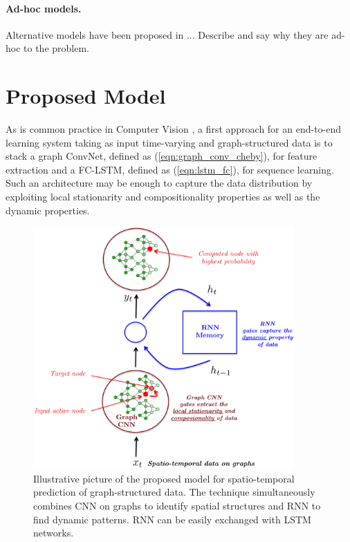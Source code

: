 \documentclass{article} %
\newcommand{\eqnref}[1]{(\ref{eqn:#1})}
\newcommand{\todo}[1]{{\color{red} #1 }}
\begin{document}
\paragraph{Ad-hoc models.} Alternative models have been proposed \todo{in ...
Describe and say why they are ad-hoc to the problem.}

\section{Proposed Model}


As is common practice in Computer Vision \citep{cnnlstm1, cnnlstm2, cnnlstm3},
a first approach for an end-to-end learning system taking as input time-varying
and graph-structured data is to stack a graph ConvNet, defined as
\eqnref{graph_conv_cheby}, for feature extraction and a FC-LSTM, defined as
\eqnref{lstm_fc}, for sequence learning. Such an architecture may be enough to
capture the data distribution by exploiting local stationarity and
compositionality properties as well as the dynamic properties.

\begin{figure}[ht]
	\centering
	\includegraphics[width=10cm]{images/gcnn_rnn.eps}
	\caption{Illustrative picture of the proposed model for spatio-temporal prediction of graph-structured data. The technique simultaneously combines CNN on graphs to identify spatial structures and RNN to find dynamic patterns. RNN can be easily exchanged with LSTM networks.}
\end{figure}
\end{document}
